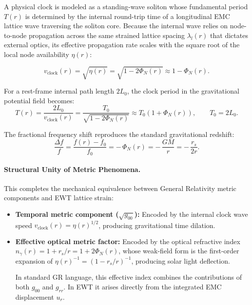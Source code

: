 \documentclass[10pt,a4paper]{article}
\begin{document}
A physical clock is modeled as a standing-wave soliton whose
fundamental period \(T(r)\) is determined by the internal round-trip
time of a longitudinal EMC lattice wave traversing the soliton core.
Because the internal wave relies on node-to-node propagation across
the same strained lattice spacing \(\lambda_l(r)\) that dictates
external optics, its effective propagation rate scales with the
square root of the local node availability \(\eta(r)\):

\begin{equation}
	v_{\text{clock}}(r)
	= \sqrt{\eta(r)}
	= \sqrt{1 - 2\Phi_N(r)}
	\approx 1 - \Phi_N(r).
	\label{eq:internal_clock_speed}
\end{equation}

For a rest-frame internal path length \(2L_0\), the clock period in
the gravitational potential field becomes:
\begin{equation}
	T(r)
	= \frac{2L_0}{v_{\text{clock}}(r)}
	= \frac{T_0}{\sqrt{1 - 2\Phi_N(r)}}
	\approx T_0\left(1 + \Phi_N(r)\right),
	\qquad T_0 = 2L_0.
\end{equation}

The fractional frequency shift reproduces the standard gravitational
redshift:
\begin{equation}
	\frac{\Delta f}{f}
	= \frac{f(r) - f_0}{f_0}
	= -\,\Phi_N(r)
	= -\,\frac{GM}{r}
	= -\,\frac{r_s}{2r}.
	\label{eq:grav_redshift_emc}
\end{equation}

\paragraph{Structural Unity of Metric Phenomena.}
This completes the mechanical equivalence between General Relativity
metric components and EWT lattice strain:

\begin{itemize}
	\item \textbf{Temporal metric component ($\sqrt{g_{00}}$):}
	Encoded by the internal clock wave speed
	\(v_{\text{clock}}(r) = \eta(r)^{1/2}\), producing gravitational
	time dilation.
	
	\item \textbf{Effective optical metric factor:}
Encoded by the optical refractive index
\(n_\gamma(r) = 1 + r_s/r = 1 + 2\Phi_N(r)\), whose weak-field
form is the first-order expansion of
\(\eta(r)^{-1} = (1 - r_s/r)^{-1}\), producing solar light
deflection.
	
	In standard GR language, this effective index combines the
	contributions of both \(g_{00}\) and \(g_{rr}\). In EWT it
	arises directly from the integrated EMC displacement \(u_r\).
\end{itemize}
\end{document}
